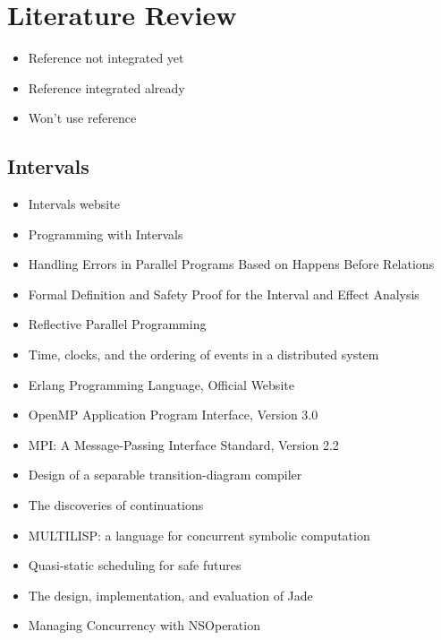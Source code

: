 
\chapter{Literature Review}
\label{cha:literature-review}

\begin{itemize}
\item[\textbullet] Reference not integrated yet
\item[\checkmark] Reference integrated already
\item[\texttimes] Won't use reference
\end{itemize}


\section*{Intervals}
\label{sec:lr-intervals}

\begin{itemize}
\item[\checkmark] Intervals website \cite{Matsakis2010}
\item[\checkmark] Programming with Intervals \cite{Matsakis2009a}
\item[\checkmark] Handling Errors in Parallel Programs Based on
  Happens Before Relations \cite{Matsakis2010a}
\item[\checkmark] Formal Definition and Safety Proof for the Interval
  and Effect Analysis \cite{Matsakis2009}
\item[\checkmark] Reflective Parallel Programming \cite{Matsakis2010b}
\item[\checkmark] Time, clocks, and the ordering of events in a
  distributed system \cite{Lamport1978}
\item[\texttimes] Erlang Programming Language, Official Website
  \cite{Erlang2010}
\item[\texttimes] OpenMP Application Program Interface, Version 3.0
  \cite{OpenMP2008}
\item[\texttimes] MPI: A Message-Passing Interface Standard, Version
  2.2 \cite{MPI2009}
\item[\texttimes] Design of a separable transition-diagram compiler
  \cite{Conway1963}
\item[\texttimes] The discoveries of continuations
  \cite{Reynolds1993}
\item[\texttimes] MULTILISP: a language for concurrent symbolic
  computation \cite{Halstead1985}
\item[\texttimes] Quasi-static scheduling for safe futures
  \cite{Navabi2008}
\item[\texttimes] The design, implementation, and evaluation of Jade
  \cite{Rinard1998}
\item[\texttimes] Managing Concurrency with NSOperation
  \cite{Apple2008}
\end{itemize}


